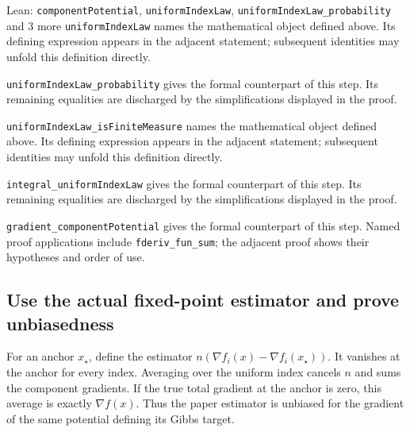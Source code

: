 \documentclass[11pt,a4paper]{report}
\begin{document}
\begin{leanbox}{Lean: \texttt{componentPotential}, \texttt{uniformIndexLaw}, \texttt{uniformIndexLaw\_\allowbreak{}probability} and 3 more}
\texttt{uniform\allowbreak{}Index\allowbreak{}Law} names the mathematical object defined above. Its defining expression appears in the adjacent statement; subsequent identities may unfold this definition directly.




\texttt{uniform\allowbreak{}Index\allowbreak{}Law\_\allowbreak{}probability} gives the formal counterpart of this step. Its remaining equalities are discharged by the simplifications displayed in the proof.




\texttt{uniform\allowbreak{}Index\allowbreak{}Law\_\allowbreak{}is\allowbreak{}Finite\allowbreak{}Measure} names the mathematical object defined above. Its defining expression appears in the adjacent statement; subsequent identities may unfold this definition directly.




\texttt{integral\_\allowbreak{}uniform\allowbreak{}Index\allowbreak{}Law} gives the formal counterpart of this step. Its remaining equalities are discharged by the simplifications displayed in the proof.




\texttt{gradient\_\allowbreak{}component\allowbreak{}Potential} gives the formal counterpart of this step. Named proof applications include \texttt{fderiv\_\allowbreak{}fun\_\allowbreak{}sum}; the adjacent proof shows their hypotheses and order of use.
\end{leanbox}
\subsection{\texorpdfstring{Use the actual fixed-point estimator and prove unbiasedness}{Use the actual fixed-point estimator and prove unbiasedness}}
\label{report-step-AverageLMC-SGLDEstimator-lean-2}


For an anchor \(x_\star\), define the estimator \(n(\nabla f_i(x)-\nabla f_i(x_\star))\). It vanishes at the anchor for every index. Averaging over the uniform index cancels \(n\) and sums the component gradients. If the true total gradient at the anchor is zero, this average is exactly \(\nabla f(x)\). Thus the paper estimator is unbiased for the gradient of the same potential defining its Gibbs target.
\end{document}
